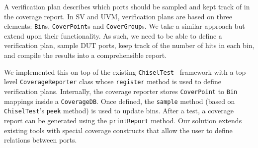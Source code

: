 \documentclass[a4paper]{IEEEtran}
\begin{document}
A verification plan describes which ports should be sampled and kept track of in the coverage report. In SV and UVM, verification plans are based on three elements: \texttt{Bin}s, \texttt{CoverPoint}s and \texttt{CoverGroup}s. We take a similar approach but extend upon their functionality. As such, we need to be able to %
define a verification plan, %
sample DUT ports, %
keep track of the number of hits in each bin, %
and compile the results into a comprehensible report.%

We implemented this on top of the existing \texttt{ChiselTest}~\cite{chisel:tester2} framework with a top-level \texttt{CoverageReporter} class whose \texttt{register} method is used to define verification plans. Internally, the coverage reporter stores \texttt{CoverPoint} to \texttt{Bin} mappings inside a \texttt{CoverageDB}. Once defined, the \texttt{sample} method (based on \texttt{ChiselTest}'s \texttt{peek} method) is used to update bins. After a test, a coverage report can be generated using the \texttt{printReport} method. Our solution extends existing tools with special coverage constructs that allow the user to define relations between ports. %
\end{document}

